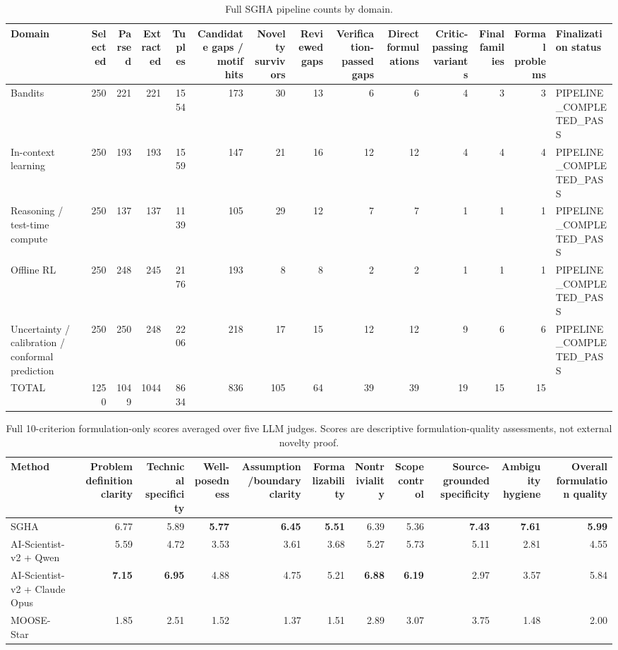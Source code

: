 \begin{table}[htbp]
\centering
\caption{Full SGHA pipeline counts by domain.}
\label{tab:full\_pipeline\_counts}
\begin{tabular}{lrrrrrrrrrrrrl}
\toprule
Domain & Selected & Parsed & Extracted & Tuples & Candidate gaps / motif hits & Novelty survivors & Reviewed gaps & Verification-passed gaps & Direct formulations & Critic-passing variants & Final families & Formal problems & Finalization status \\
\midrule
Bandits & 250 & 221 & 221 & 1554 & 173 & 30 & 13 & 6 & 6 & 4 & 3 & 3 & PIPELINE\_COMPLETED\_PASS \\
In-context learning & 250 & 193 & 193 & 1559 & 147 & 21 & 16 & 12 & 12 & 4 & 4 & 4 & PIPELINE\_COMPLETED\_PASS \\
Reasoning / test-time compute & 250 & 137 & 137 & 1139 & 105 & 29 & 12 & 7 & 7 & 1 & 1 & 1 & PIPELINE\_COMPLETED\_PASS \\
Offline RL & 250 & 248 & 245 & 2176 & 193 & 8 & 8 & 2 & 2 & 1 & 1 & 1 & PIPELINE\_COMPLETED\_PASS \\
Uncertainty / calibration / conformal prediction & 250 & 250 & 248 & 2206 & 218 & 17 & 15 & 12 & 12 & 9 & 6 & 6 & PIPELINE\_COMPLETED\_PASS \\
TOTAL & 1250 & 1049 & 1044 & 8634 & 836 & 105 & 64 & 39 & 39 & 19 & 15 & 15 &  \\
\bottomrule
\end{tabular}
\end{table}

\begin{table}[t]
\centering
\small
\caption{Full 10-criterion formulation-only scores averaged over five LLM judges. Scores are descriptive formulation-quality assessments, not external novelty proof.}
\label{tab:appendix_full_formulation_quality_with_moose}
\begin{tabular}{lrrrrrrrrrr}
\toprule
Method & Problem definition clarity & Technical specificity & Well-posedness & Assumption/boundary clarity & Formalizability & Nontriviality & Scope control & Source-grounded specificity & Ambiguity hygiene & Overall formulation quality \\
\midrule
SGHA & 6.77 & 5.89 & \textbf{5.77} & \textbf{6.45} & \textbf{5.51} & 6.39 & 5.36 & \textbf{7.43} & \textbf{7.61} & \textbf{5.99} \\
AI-Scientist-v2 + Qwen & 5.59 & 4.72 & 3.53 & 3.61 & 3.68 & 5.27 & 5.73 & 5.11 & 2.81 & 4.55 \\
AI-Scientist-v2 + Claude Opus & \textbf{7.15} & \textbf{6.95} & 4.88 & 4.75 & 5.21 & \textbf{6.88} & \textbf{6.19} & 2.97 & 3.57 & 5.84 \\
MOOSE-Star & 1.85 & 2.51 & 1.52 & 1.37 & 1.51 & 2.89 & 3.07 & 3.75 & 1.48 & 2.00 \\
\bottomrule
\end{tabular}
\end{table}

